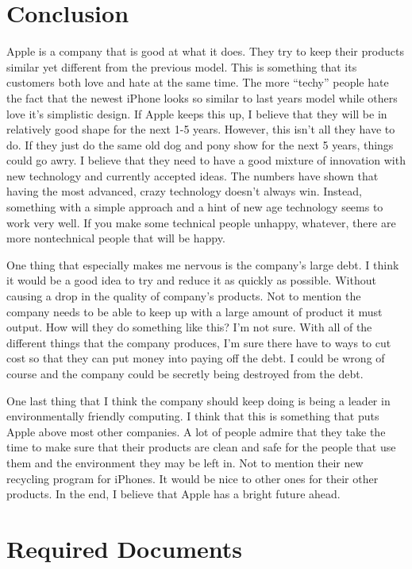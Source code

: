 \documentclass[12pt,a4paper,titlepage]{article}
\begin{document}
\section{Conclusion}
Apple is a company that is good at what it does. They try to keep their products
similar yet different from the previous model. This is something that its
customers both love and hate at the same time. The more ``techy'' people hate
the fact that the newest iPhone looks so similar to last years model while
others love it's simplistic design. If Apple keeps this up, I believe that they
will be in relatively good shape for the next 1-5 years. However, this isn't all
they have to do. If they just do the same old dog and pony show for the next 5
years, things could go awry. I believe that they need to have a good mixture of
innovation with new technology and currently accepted ideas. The numbers have
shown that having the most advanced, crazy technology doesn't always
win. Instead, something with a simple approach and a hint of new age technology
seems to work very well. If you make some technical people unhappy, whatever,
there are more nontechnical people that will be happy.

One thing that especially makes me nervous is the company's large debt. I think
it would be a good idea to try and reduce it as quickly as possible. Without
causing a drop in the quality of company's products. Not to mention the company
needs to be able to keep up with a large amount of product it must output. How
will they do something like this? I'm not sure. With all of the different things
that the company produces, I'm sure there have to ways to cut cost so that they
can put money into paying off the debt. I could be wrong of course and the
company could be secretly being destroyed from the debt.

One last thing that I think the company should keep doing is being a leader in
environmentally friendly computing. I think that this is something that puts
Apple above most other companies. A lot of people admire that they take the time
to make sure that their products are clean and safe for the people that use them
and the environment they may be left in. Not to mention their new recycling
program for iPhones. It would be nice to other ones for their other products. In
the end, I believe that Apple has a bright future ahead.

\newpage

\section{Required Documents}
\end{document}
